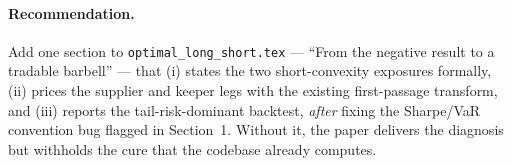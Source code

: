\documentclass[11pt]{article}
\newcommand{\code}[1]{\texttt{\small #1}}
\begin{document}
\paragraph{Recommendation.} Add one section to
\code{optimal\_long\_short.tex} --- ``From the negative result to a tradable
barbell'' --- that (i) states the two short-convexity exposures formally, (ii)
prices the supplier and keeper legs with the existing first-passage transform,
and (iii) reports the tail-risk-dominant backtest, \emph{after} fixing the
Sharpe/VaR convention bug flagged in Section~1. Without it, the paper delivers
the diagnosis but withholds the cure that the codebase already computes.
\end{document}
